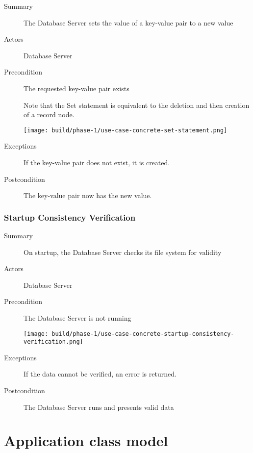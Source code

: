 \documentclass[a4paper]{report}
\begin{document}
	\begin{description}
		\item[Summary] The Database Server sets the value of a key-value pair to a new value
		\item[Actors] Database Server
		\item[Precondition] The requested key-value pair exists

		Note that the Set statement is equivalent to the deletion and then creation of a record node.

		\begin{center}
			\texttt{[image: build/phase-1/use-case-concrete-set-statement.png]}
		\end{center}

		\item[Exceptions] If the key-value pair does not exist, it is created.
		\item[Postcondition] The key-value pair now has the new value.
	\end{description}

	\pagebreak
	
	\subsection{Startup Consistency Verification}

	\begin{description}
		\item[Summary] On startup, the Database Server checks its file system for validity
		\item[Actors] Database Server
		\item[Precondition] The Database Server is not running

		\begin{center}
			\texttt{[image: build/phase-1/use-case-concrete-startup-consistency-verification.png]}
		\end{center}

		\item[Exceptions] If the data cannot be verified, an error is returned.
		\item[Postcondition] The Database Server runs and presents valid data
	\end{description}

\chapter{Application class model}
\end{document}
